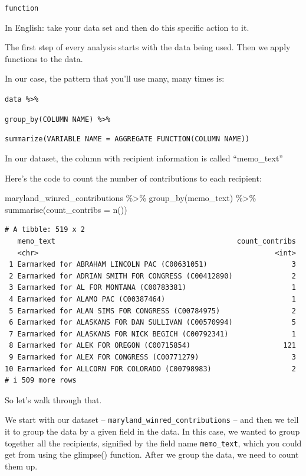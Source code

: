 \documentclass[
  letterpaper,
  DIV=11,
  numbers=noendperiod]{scrreprt}
\newenvironment{Shaded}{\begin{snugshade}}{\end{snugshade}}
\newcommand{\AttributeTok}[1]{\textcolor[rgb]{0.40,0.45,0.13}{#1}}
\newcommand{\FunctionTok}[1]{\textcolor[rgb]{0.28,0.35,0.67}{#1}}
\newcommand{\NormalTok}[1]{\textcolor[rgb]{0.00,0.23,0.31}{#1}}
\newcommand{\SpecialCharTok}[1]{\textcolor[rgb]{0.37,0.37,0.37}{#1}}
\begin{document}
\texttt{function}

In English: take your data set and then do this specific action to it.

The first step of every analysis starts with the data being used. Then
we apply functions to the data.

In our case, the pattern that you'll use many, many times is:

\texttt{data\ \%\textgreater{}\%}

\texttt{group\_by(COLUMN\ NAME)\ \%\textgreater{}\%}

\texttt{summarize(VARIABLE\ NAME\ =\ AGGREGATE\ FUNCTION(COLUMN\ NAME))}

In our dataset, the column with recipient information is called
``memo\_text''

Here's the code to count the number of contributions to each recipient:

\begin{Shaded}
\begin{Highlighting}[]
\NormalTok{maryland\_winred\_contributions }\SpecialCharTok{\%\textgreater{}\%}
  \FunctionTok{group\_by}\NormalTok{(memo\_text) }\SpecialCharTok{\%\textgreater{}\%}
  \FunctionTok{summarise}\NormalTok{(}\AttributeTok{count\_contribs =} \FunctionTok{n}\NormalTok{())}
\end{Highlighting}
\end{Shaded}

\begin{verbatim}
# A tibble: 519 x 2
   memo_text                                           count_contribs
   <chr>                                                        <int>
 1 Earmarked for ABRAHAM LINCOLN PAC (C00631051)                    3
 2 Earmarked for ADRIAN SMITH FOR CONGRESS (C00412890)              2
 3 Earmarked for AL FOR MONTANA (C00783381)                         1
 4 Earmarked for ALAMO PAC (C00387464)                              1
 5 Earmarked for ALAN SIMS FOR CONGRESS (C00784975)                 2
 6 Earmarked for ALASKANS FOR DAN SULLIVAN (C00570994)              5
 7 Earmarked for ALASKANS FOR NICK BEGICH (C00792341)               1
 8 Earmarked for ALEK FOR OREGON (C00715854)                      121
 9 Earmarked for ALEX FOR CONGRESS (C00771279)                      3
10 Earmarked for ALLCORN FOR COLORADO (C00798983)                   2
# i 509 more rows
\end{verbatim}

So let's walk through that.

We start with our dataset -- \texttt{maryland\_winred\_contributions} --
and then we tell it to group the data by a given field in the data. In
this case, we wanted to group together all the recipients, signified by
the field name \texttt{memo\_text}, which you could get from using the
glimpse() function. After we group the data, we need to count them up.
\end{document}

